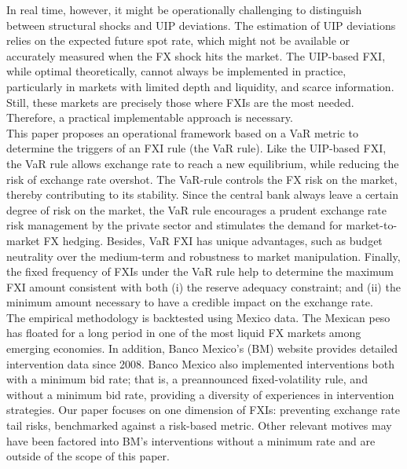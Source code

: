 \documentclass[11pt]{article}
\begin{document}
In real  time, however, it  might be operationally challenging  to distinguish
between structural shocks and UIP deviations. The estimation of UIP deviations
relies  on the  expected future  spot rate,  which might  not be  available or
accurately measured  when the  FX shock  hits the  market. The  UIP-based FXI,
while  optimal  theoretically,  cannot  always  be  implemented  in  practice,
particularly  in  markets  with  limited   depth  and  liquidity,  and  scarce
information. Still, these markets are precisely  those where FXIs are the most
needed. Therefore, a practical implementable approach is necessary.\\

This  paper  proposes an  operational  framework  based  on  a VaR  metric  to
determine the triggers of an FXI rule  (the VaR rule). Like the UIP-based FXI,
the VaR rule  allows exchange rate to reach a  new equilibrium, while reducing
the risk of exchange  rate overshot. The VaR-rule controls the  FX risk on the
market, thereby contributing  to its stability. Since the  central bank always
leave  a certain  degree of  risk on  the market,  the VaR  rule encourages  a
prudent exchange rate risk management by the private sector and stimulates the
demand  for  market-to-market  FX  hedging.    Besides,  VaR  FXI  has  unique
advantages, such as  budget neutrality over the medium-term  and robustness to
market manipulation. Finally,  the fixed frequency of FXIs under  the VaR rule
help to determine the maximum FXI  amount consistent with both (i) the reserve
adequacy constraint; and (ii) the minimum  amount necessary to have a credible
impact on the exchange rate.\\

The empirical  methodology is backtested  using Mexico data. The  Mexican peso
has floated  for a  long period  in one of  the most  liquid FX  markets among
emerging economies. In addition, Banco Mexico’s (BM) website provides detailed
intervention data since 2008. Banco Mexico also implemented interventions both
with a  minimum bid rate; that  is, a preannounced fixed-volatility  rule, and
without  a  minimum  bid  rate,   providing  a  diversity  of  experiences  in
intervention  strategies.   Our  paper  focuses  on  one  dimension  of  FXIs:
preventing  exchange  rate  tail   risks,  benchmarked  against  a  risk-based
metric. Other relevant motives may  have been factored into BM’s interventions
without a minimum rate and are outside of the scope of this paper.\\
\end{document}
